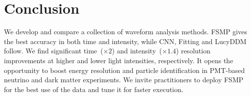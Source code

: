 \section{Conclusion}
\label{sec:conclusion}

We develop and compare a collection of waveform analysis methods.  FSMP gives the best accuracy in both time and intensity, while CNN, Fitting and LucyDDM follow.  We find significant time~($\times 2$) and intensity~($\times 1.4$) resolution improvements at higher and lower light intensities, respectively.  It opens the opportunity to boost energy resolution and particle identification in PMT-based neutrino and dark matter experiments.  We invite practitioners to deploy FSMP for the best use of the data and tune it for faster execution.
